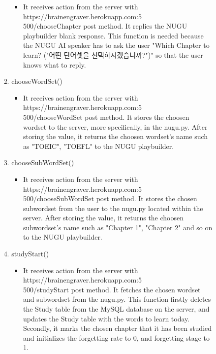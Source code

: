 \documentclass[conference]{IEEEtran}
\begin{document}
\begin{enumerate}
\begin{enumerate}
\begin{enumerate}
\begin{enumerate}
\begin{itemize}
                                        \item It receives action from the server with https://brainengraver.herokuapp.com:5\\500/chooseChapter post method. It replies the NUGU playbuilder blank response. This function is needed because the NUGU AI speaker has to ask the user "Which Chapter to learn? ("어떤 단어셋을 선택하시겠습니까?")" so that the user knows what to reply.
                                    \end{itemize}
                                \item chooseWordSet()
                                    \begin{itemize}
                                        \item It receives action from the server with https://brainengraver.herokuapp.com:5\\500/chooseWordSet post method. It stores the choosen wordset to the server, more specifically, in the nugu.py. After storing the value, it returns the choosen wordset's name such as "TOEIC", "TOEFL" to the NUGU playbuilder.
                                    \end{itemize}
                                \item chooseSubWordSet()
                                    \begin{itemize}
                                        \item It receives action from the server with https://brainengraver.herokuapp.com:5\\500/chooseSubWordSet post method. It stores the chosen subwordset from the user to the nugu.py located within the server. After storing the value, it returns the choosen subwordset's name such as "Chapter 1", "Chapter 2" and so on to the NUGU playbuilder.
                                    \end{itemize}
                                \item studyStart()
                                    \begin{itemize}
                                        \item It receives action from the server with https://brainengraver.herokuapp.com:5\\500/studyStart post method. It fetches the chosen wordset and subwordset from the nugu.py. This function firstly deletes the Study table from the MySQL database on the server, and updates the Study table with the words to learn today. Secondly, it marks the chosen chapter that it has been studied and initializes the forgetting rate to 0, and forgetting stage to 1.

\end{itemize}
\end{enumerate}
\end{enumerate}
\end{enumerate}
\end{enumerate}
\end{document}
